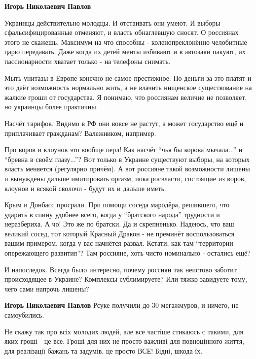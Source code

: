 \begin{itemize}
\begin{itemize}
\textbf{Игорь Николаевич Павлов} 

Украинцы действительно молодцы. И отстаивать они умеют. И выборы
сфальсифицированные отменяют, и власть обнаглевшую сносят. О россиянах этого не
скажешь. Максимум на что способны - коленопреклонённо челобитные царю
передавать. Даже когда их детей менты избивают и в автозаки пакуют, их
пассионарности хватает только - на телефоны снимать.

Мыть унитазы в Европе конечно не самое престижное. Но деньги за это платят и
это даёт возможность нормально жить, а не влачить нищенское существование на
жалкие гроши от государства. Я понимаю, что россиянам величие не позволяет, но
украинцы более практичны.

Насчёт тарифов. Видимо в РФ они вовсе не растут, а может государство ещё и
приплачивает гражданам? Валежником, например.

Про воров и клоунов это вообще перл! Как насчёт \enquote{чья бы корова мычала...} и
\enquote{бревна в своём глазу...}? Вот только в Украине существуют выборы, на которых
власть меняется (регулярно причём). А вот россияне такой возможности лишены и
вынуждены дальше имитировать оргазм, пока росвласти, состоящие из воров, клоунов и
всякой сволочи - будут их и дальше иметь.

Крым и Донбасс просрали. При помощи соседа мародёра, решившего, что ударить в
спину удобнее всего, когда у \enquote{братского народа} трудности и неразбериха. А чо!
Это же по братски. Да и скрепненько. Надеюсь, что ваш великий сосед, тот который
Красный Дракон - не преминёт воспользоваться вашим примером, когда у вас
начнётся развал. Кстати, как там \enquote{территории опережающего развития}? Там
россияне, хоть чисто номинально - остались ещё?

И напоследок. Всегда было интересно, почему россиян так неистово заботит
происходящее в Украине? Комплексы сублимируете? Или тяжко завидуете тому, чего
сами напрочь лишены?

\textbf{Игорь Николаевич Павлов} Рсуке получили до 30 мегажмуров, и ничего, не самоубились.

\end{itemize} %


Не скажу так про всіх молодих людей, але все частіше стикаюсь с такими, для
яких гроші - це все. Гроші для них не просто важливі для повноцінного життя,
для реалізації бажань та задумів, це просто ВСЕ! Бідні, шкода їх.


\end{itemize}
